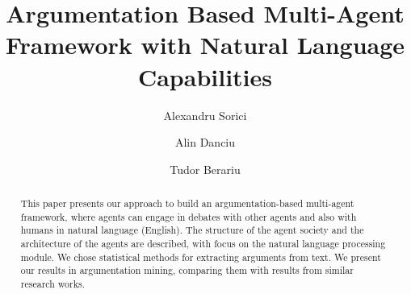 \documentclass[lnbip]{svmultln}
\begin{document}
%
\mainmatter              %
%
\title{Argumentation Based Multi-Agent Framework with Natural Language Capabilities}
%
%
\author{Alexandru Sorici \and Alin Danciu \and
Tudor Berariu}
%
%
%

\maketitle              %


\begin{abstract}        %
This paper presents our approach to build an argumentation-based multi-agent framework, where agents can engage in debates with other agents and also with humans in natural language (English). The structure of the agent society and the architecture of the agents are described, with focus on the natural language processing module. We chose statistical methods for extracting arguments from text. We present our results in argumentation mining, comparing them with results from similar research works.

\end{abstract}






{\small}
\end{document}
